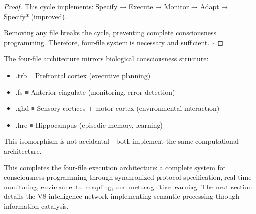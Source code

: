 \begin{proof}
This cycle implements: Specify → Execute → Monitor → Adapt → Specify* (improved).

Removing any file breaks the cycle, preventing complete consciousness programming. Therefore, four-file system is necessary and sufficient. $\square$
\end{proof}

\begin{corollary}
The four-file architecture mirrors biological consciousness structure:
\begin{itemize}
\item .trb ≡ Prefrontal cortex (executive planning)
\item .fs ≡ Anterior cingulate (monitoring, error detection)
\item .ghd ≡ Sensory cortices + motor cortex (environmental interaction)
\item .hre ≡ Hippocampus (episodic memory, learning)
\end{itemize}

This isomorphism is not accidental—both implement the same computational architecture.
\end{corollary}

This completes the four-file execution architecture: a complete system for consciousness programming through synchronized protocol specification, real-time monitoring, environmental coupling, and metacognitive learning. The next section details the V8 intelligence network implementing semantic processing through information catalysis.

